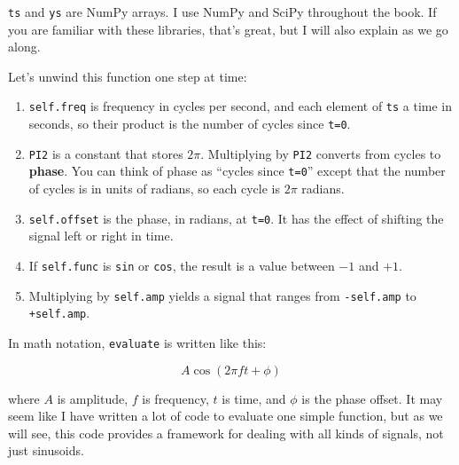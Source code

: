 \documentclass[12pt]{book}
\begin{document}
{\tt ts} and {\tt ys} are NumPy arrays.  I use NumPy and SciPy
throughout the book.  If you are familiar with these libraries,
that's great, but I will also explain as we go along.

Let's unwind this function one step at time:

\begin{enumerate}

\item {\tt self.freq} is frequency in cycles per second, and
each element of {\tt ts} a time in seconds, so their product is
the number of cycles since {\tt t=0}.

\item {\tt PI2} is a constant that stores $2 \pi$.  Multiplying
by {\tt PI2} converts from cycles to {\bf phase}.  You can
think of phase as ``cycles since {\tt t=0}'' except that the number
of cycles is in units of radians, so each cycle is $2 \pi$ radians.

\item {\tt self.offset} is the phase, in radians, at {\tt t=0}.  It has
the effect of shifting the signal left or right in time.

\item If {\tt self.func} is {\tt sin} or {\tt cos}, the result is
a value between $-1$ and $+1$.

\item Multiplying by {\tt self.amp} yields a signal that ranges
from {\tt -self.amp} to {\tt +self.amp}.

\end{enumerate}

In math notation, {\tt evaluate} is written like this:

\[ A \cos (2 \pi f t + \phi) \]

where $A$ is amplitude, $f$ is frequency, $t$ is time, and $\phi$
is the phase offset.  It may seem like I have written a lot of code
to evaluate one simple function, but as we will see, this code
provides a framework for dealing with all kinds of signals, not
just sinusoids.


\chapter{}

\section{}


\begin{verbatim}
\end{verbatim}
\end{document}
